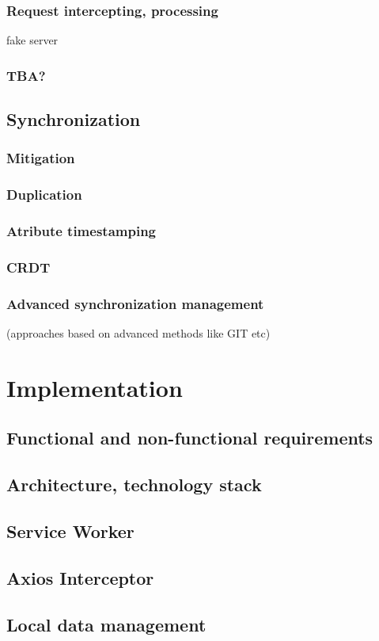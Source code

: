 \documentclass[
  digital,     %
  color,       %
  oneside,     %
  nosansbold,  %
  nocolorbold, %
  lof,         %
  lot,         %
]{fithesis4}
\begin{document}
\subsection{Request intercepting, processing}
fake server
\subsection{TBA?}
\section{Synchronization}
\subsection{Mitigation}
\subsection{Duplication}
\subsection{Atribute timestamping}
\subsection{CRDT}
\subsection{Advanced synchronization management}
(approaches based on advanced methods like GIT etc)

\chapter{Implementation}
\section{Functional and non-functional requirements}
\section{Architecture, technology stack}
\section{Service Worker}
\section{Axios Interceptor}
\section{Local data management}
\end{document}
